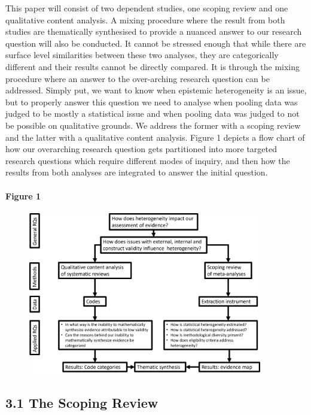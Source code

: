 \documentclass[
  letterpaper,
  DIV=11,
  numbers=noendperiod]{scrartcl}
\let\oldparagraph\paragraph
\renewcommand{\paragraph}[1]{\oldparagraph{#1}\mbox{}}
\begin{document}
This paper will consist of two dependent studies, one scoping review and
one qualitative content analysis. A mixing procedure where the result
from both studies are thematically synthesised to provide a nuanced
answer to our research question will also be conducted. It cannot be
stressed enough that while there are surface level similarities between
these two analyses, they are categorically different and their results
cannot be directly compared. It is through the mixing procedure where an
answer to the over-arching research question can be addressed. Simply
put, we want to know when epistemic heterogeneity is an issue, but to
properly answer this question we need to analyse when pooling data was
judged to be mostly a statistical issue and when pooling data was judged
to not be possible on qualitative grounds. We address the former with a
scoping review and the latter with a qualitative content analysis.
Figure 1 depicts a flow chart of how our overarching research question
gets partitioned into more targeted research questions which require
different modes of inquiry, and then how the results from both analyses
are integrated to answer the initial question.

\hypertarget{figure-1}{%
\paragraph{Figure 1}\label{figure-1}}

\begin{figure}

{\centering \includegraphics[width=4.02083in,height=\textheight]{design_flow_chart.png}

}

\end{figure}

\hypertarget{the-scoping-review}{%
\subsection{3.1 The Scoping Review}\label{the-scoping-review}}
\end{document}
